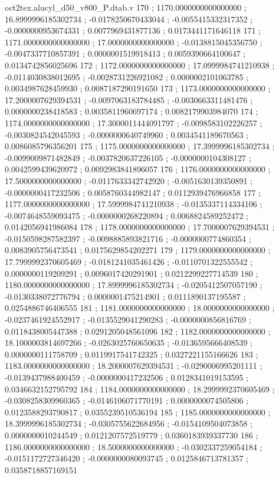 \begin{filecontents}[overwrite]{oct2tex.alucyl_d50_v800_P.dtab.v}
170 ; 1170.0000000000000000 ; 16.8999996185302734 ; -0.0178250670433044 ; -0.0055415332317352 ; -0.0000000953674331 ; 0.0077969431877136 ; 0.0173441171646118
171 ; 1171.0000000000000000 ; 17.0000000000000000 ; -0.0138815045356750 ; -0.0047337710857391 ; 0.0000001519918413 ; 0.0059390664100647 ; 0.0134742856025696
172 ; 1172.0000000000000000 ; 17.0999984741210938 ; -0.0114030838012695 ; -0.0028731226921082 ; 0.0000002101063785 ; 0.0034987628459930 ; 0.0087187290191650
173 ; 1173.0000000000000000 ; 17.2000007629394531 ; -0.0097063183784485 ; -0.0030663311481476 ; 0.0000000238418583 ; 0.0035811960697174 ; 0.0082179903984070
174 ; 1174.0000000000000000 ; 17.3000011444091797 ; -0.0098583102226257 ; -0.0030824542045593 ; -0.0000000640749960 ; 0.0034541189670563 ; 0.0086085796356201
175 ; 1175.0000000000000000 ; 17.3999996185302734 ; -0.0099009871482849 ; -0.0037820637226105 ; -0.0000000104308127 ; 0.0042599439620972 ; 0.0092983841896057
176 ; 1176.0000000000000000 ; 17.5000000000000000 ; -0.0117633342742920 ; -0.0051630139350891 ; -0.0000000417232506 ; 0.0058760344982147 ; 0.0112939476966858
177 ; 1177.0000000000000000 ; 17.5999984741210938 ; -0.0135337114334106 ; -0.0074648559093475 ; -0.0000000268220894 ; 0.0068824589252472 ; 0.0142056941986084
178 ; 1178.0000000000000000 ; 17.7000007629394531 ; -0.0150598287582397 ; -0.0098885893821716 ; -0.0000000774860354 ; 0.0083905756473541 ; 0.0175629854202271
179 ; 1179.0000000000000000 ; 17.7999992370605469 ; -0.0181241035461426 ; -0.0110701322555542 ; 0.0000000119209291 ; 0.0096017420291901 ; 0.0212299227714539
180 ; 1180.0000000000000000 ; 17.8999996185302734 ; -0.0205412507057190 ; -0.0130338072776794 ; 0.0000001475214901 ; 0.0111890137195587 ; 0.0254886746406555
181 ; 1181.0000000000000000 ; 18.0000000000000000 ; -0.0237461924552917 ; -0.0135529041290283 ; -0.0000000856816769 ; 0.0118438005447388 ; 0.0291205048561096
182 ; 1182.0000000000000000 ; 18.1000003814697266 ; -0.0263025760650635 ; -0.0136595666408539 ; 0.0000000111758709 ; 0.0119917541742325 ; 0.0327221155166626
183 ; 1183.0000000000000000 ; 18.2000007629394531 ; -0.0290006995201111 ; -0.0139437988400459 ; -0.0000000417232506 ; 0.0128341019153595 ; 0.0346632152795792
184 ; 1184.0000000000000000 ; 18.2999992370605469 ; -0.0308258309960365 ; -0.0146106071770191 ; 0.0000000074505806 ; 0.0123588293790817 ; 0.0355239510536194
185 ; 1185.0000000000000000 ; 18.3999996185302734 ; -0.0305755622684956 ; -0.0154109504073858 ; 0.0000000010244549 ; 0.0121207572519779 ; 0.0360183939337730
186 ; 1186.0000000000000000 ; 18.5000000000000000 ; -0.0302337259054184 ; -0.0151172727346420 ; -0.0000000080093745 ; 0.0125846713781357 ; 0.0358718857169151

\end{filecontents}
